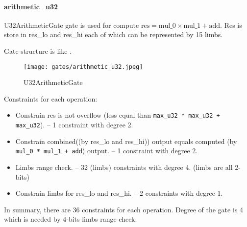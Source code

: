 \paragraph{arithmetic\_u32}

U32ArithmeticGate gate is used for compute $\text{res} = \text{mul\_0} \times \text{mul\_1} + \text{add}$. Res is store in res\_lo and res\_hi each of which can be represented by 15 limbs.

Gate structure is like .

\begin{figure}[!ht]
    \centering
    \texttt{[image: gates/arithmetic\_u32.jpeg]}
    \caption{U32ArithmeticGate}
    \label{fig:arithmetic-u32}
\end{figure}

Constraints for each operation:
\begin{itemize}
    \item Constrain res is not overflow (less equal than \verb|max_u32 * max_u32 + max_u32|). -- 1 constraint with degree 2.
    \item Constrain combined((by res\_lo and res\_hi)) output equals computed (by \verb|mul_0 * mul_1 + add|) output. -- 1 constraint with degree 2.
    \item Limbs range check. -- 32 (limbs) constraints with degree 4. (limbs are all 2-bits)
    \item Constrain limbs for res\_lo and res\_hi. -- 2 constraints with degree 1.
\end{itemize}

In summary, there are 36 constraints for each operation. Degree of the gate is 4 which is needed by 4-bits limbs range check.
